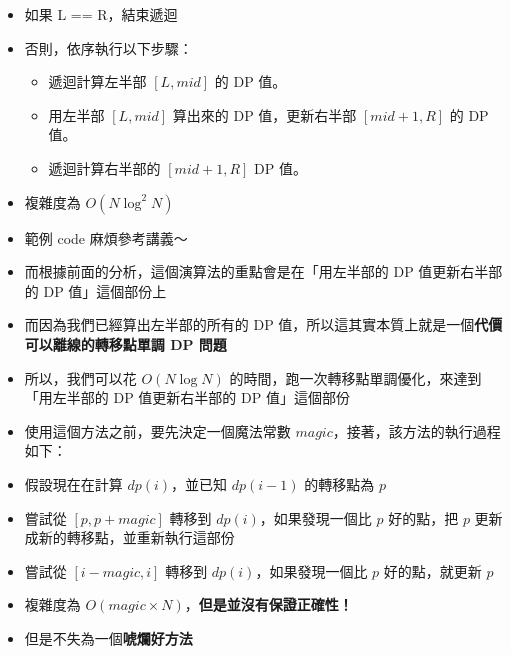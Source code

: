 \documentclass[standalone]{beamer}
\begin{document}
\begin{frame}{}
  \begin{itemize}
    \item 如果 L == R，結束遞迴
    \item 否則，依序執行以下步驟：
    \begin{itemize}
      \item 遞迴計算左半部 $[L, mid]$ 的 DP 值。
      \item 用左半部 $[L, mid]$ 算出來的 DP 值，更新右半部 $[mid + 1, R]$ 的 DP 值。
      \item 遞迴計算右半部的 $[mid + 1, R]$ DP 值。
    \end{itemize}
    \item 複雜度為 $O(N \log^2 N)$
    \item 範例 code 麻煩參考講義～
  \end{itemize}
\end{frame}

\begin{frame}{}
  \begin{itemize}
  \item 而根據前面的分析，這個演算法的重點會是在「用左半部的 DP 值更新右半部的 DP 值」這個部份上
  \item 而因為我們已經算出左半部的所有的 DP 值，所以這其實本質上就是一個\textbf{代價可以離線的轉移點單調 DP 問題}
  \item 所以，我們可以花 $O(N \log N)$ 的時間，跑一次轉移點單調優化，來達到「用左半部的 DP 值更新右半部的 DP 值」這個部份
  \end{itemize}
\end{frame}

\begin{frame}{}
  \begin{itemize}
    \item 使用這個方法之前，要先決定一個魔法常數 $magic$，接著，該方法的執行過程如下：
    \item 假設現在在計算 $dp(i)$，並已知 $dp(i - 1)$ 的轉移點為 $p$
    \item 嘗試從 $[p, p + magic]$ 轉移到 $dp(i)$，如果發現一個比 $p$ 好的點，把 $p$ 更新成新的轉移點，並重新執行這部份
    \item 嘗試從 $[i - magic, i]$ 轉移到 $dp(i)$，如果發現一個比 $p$ 好的點，就更新 $p$
    \item 複雜度為 $O(magic \times N)$，\textbf{但是並沒有保證正確性！}
    \item 但是不失為一個\textbf{唬爛好方法}
  \end{itemize}
\end{frame}
\end{document}
